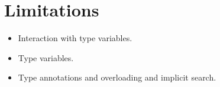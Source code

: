 \section{Limitations}
\label{sct:limitations}

\begin{itemize}
\item Interaction with type variables.
\item Type variables.
\item Type annotations and overloading and implicit search.
\end{itemize}
